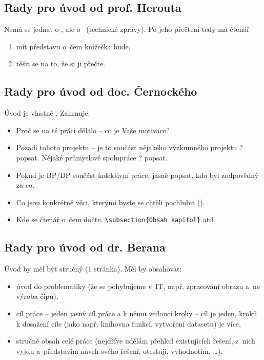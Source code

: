 \begin{samepage}
\subsection*{Rady pro úvod od prof. Herouta}
Nemá se jednat o , ale o~ (technické zprávy). Po jeho přečtení tedy má čtenář
\begin{enumerate}
  \item{mít představu o~čem knížečka bude,}
  \item{těšit se na to, že si ji přečte.}
\end{enumerate}
\end{samepage}

\subsection*{Rady pro úvod od doc. Černockého}

Úvod je vlastně . Zahrnuje:

\begin{itemize}
  \item{Proč se na té práci dělalo -- co je Vaše motivace?}
  \item{Pozadí tohoto projektu -- je to součást nějakého výzkumného projektu ? popsat. Nějaké průmyslové spolupráce ? popsat.}
  \item{Pokud je BP/DP součást kolektivní práce, jasně popsat, kdo byl zodpovědný za co.}
  \item{Co jsou konkrétně věci, kterými byste se chtěli pochlubit ().}
  \item{Kde se čtenář o~čem dočte. \texttt{\textbackslash subsection\{Obsah kapitol\}} atd.}
\end{itemize}

\subsection*{Rady pro úvod od dr. Berana}

Úvod by měl být stručný (1 stránka). Měl by obsahovat:
\begin{itemize}
  \item{úvod do problematiky (že se pohybujeme v~IT, např. zpracování obrazu a~ne výroba čipů),}
  \item{cíl práce -- jeden jasný cíl práce a k němu vedoucí kroky -- cíl je jeden, kroků k dosažení cíle (jako např. knihovna funkcí, vytvoření datasetu) je více,}
  \item{stručně obsah celé práce (nejdříve udělám přehled existujících řešení, z~nich vyjdu a~představím návrh svého řešení, otestuji, vyhodnotím, \ldots).}
\end{itemize}



